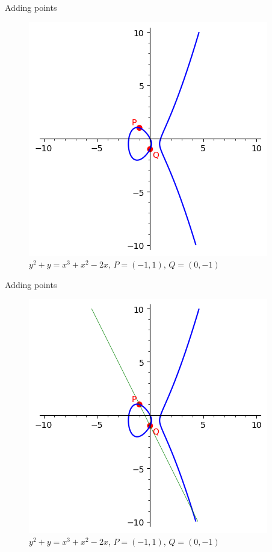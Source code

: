 \documentclass[aspectratio=169,xcolor=dvipsnames]{beamer}
\begin{document}

\begin{frame}{Adding points}
    \begin{figure}
        \centering
        \includegraphics[height=0.7\textheight]{adding-points-02.png}
        \caption{$y^2 + y = x^3 + x^2 - 2x$, $P=(-1,1)$, $Q=(0,-1)$}
    \end{figure}
\end{frame}



\begin{frame}{Adding points}
    \begin{figure}
        \centering
        \includegraphics[height=0.7\textheight]{adding-points-03.png}
        \caption{$y^2 + y = x^3 + x^2 - 2x$, $P=(-1,1)$, $Q=(0,-1)$}
    \end{figure}
\end{frame}
\end{document}
